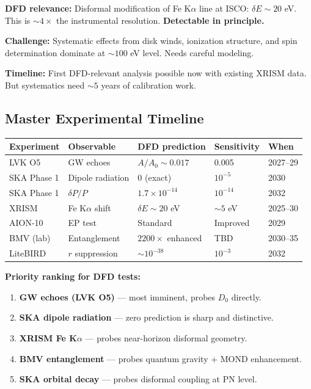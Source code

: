 \documentclass[11pt,a4paper]{article}
\begin{document}
\textbf{DFD relevance:} Disformal modification of Fe K$\alpha$ line at ISCO: $\delta E \sim 20$ eV. This is $\sim 4\times$ the instrumental resolution. \textbf{Detectable in principle.}

\textbf{Challenge:} Systematic effects from disk winds, ionization structure, and spin determination dominate at $\sim 100$ eV level. Needs careful modeling.

\textbf{Timeline:} First DFD-relevant analysis possible now with existing XRISM data. But systematics need $\sim 5$ years of calibration work.

\subsection{Master Experimental Timeline}

\begin{center}
\begin{longtable}{lllll}
\toprule
\textbf{Experiment} & \textbf{Observable} & \textbf{DFD prediction} & \textbf{Sensitivity} & \textbf{When} \\
\midrule
\endhead
LVK O5 & GW echoes & $A/A_0 \sim 0.017$ & 0.005 & 2027--29 \\
SKA Phase 1 & Dipole radiation & 0 (exact) & $10^{-5}$ & 2030 \\
SKA Phase 1 & $\delta P/P$ & $1.7\times10^{-14}$ & $10^{-14}$ & 2032 \\
XRISM & Fe K$\alpha$ shift & $\delta E \sim 20$ eV & $\sim 5$ eV & 2025--30 \\
AION-10 & EP test & Standard & Improved & 2029 \\
BMV (lab) & Entanglement & $2200\times$ enhanced & TBD & 2030--35 \\
LiteBIRD & $r$ suppression & $\sim 10^{-38}$ & $10^{-3}$ & 2032 \\
\bottomrule
\end{longtable}
\end{center}

\textbf{Priority ranking for DFD tests:}
\begin{enumerate}
\item \textbf{GW echoes (LVK O5)} --- most imminent, probes $D_0$ directly.
\item \textbf{SKA dipole radiation} --- zero prediction is sharp and distinctive.
\item \textbf{XRISM Fe K$\alpha$} --- probes near-horizon disformal geometry.
\item \textbf{BMV entanglement} --- probes quantum gravity + MOND enhancement.
\item \textbf{SKA orbital decay} --- probes disformal coupling at PN level.
\end{enumerate}
\end{document}
